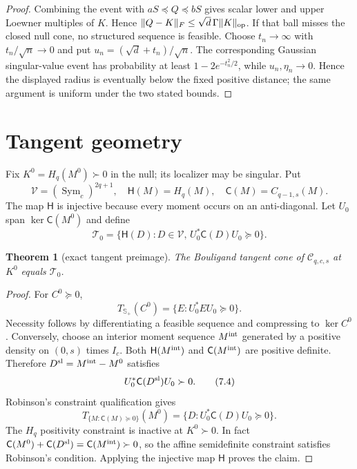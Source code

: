 \documentclass[11pt]{article}
\newtheorem{theorem}{Theorem}[section]
\newcommand{\Sym}{\operatorname{Sym}}
\newcommand{\cC}{\mathcal C}
\newcommand{\cT}{\mathcal T}
\newcommand{\norm}[1]{\lVert #1\rVert}
\begin{document}
\begin{proof}
Combining the event with $aS\preceq Q\preceq bS$ gives scalar lower and
upper Loewner multiples of $K$.  Hence
$\norm{Q-K}_F\le\sqrt d\,\Gamma\norm{K}_{\rm op}$.  If that ball misses the
closed null cone, no structured sequence is feasible.  Choose $t_n\to\infty$
with $t_n/\sqrt n\to0$ and put $u_n=(\sqrt d+t_n)/\sqrt n$.  The corresponding
Gaussian singular-value event has probability at least $1-2e^{-t_n^2/2}$,
while $u_n,\eta_n\to0$.  Hence the displayed radius is eventually below the
fixed positive distance; the same argument is uniform under the two stated
bounds.
\end{proof}

\section{Tangent geometry}

Fix $K^0=H_q(M^0)\succ0$ in the null; its localizer may be singular.  Put
\[
\mathcal V=(\Sym_c)^{2q+1},\quad
\mathsf H(M)=H_q(M),\quad
\mathsf C(M)=C_{q-1,s}(M).                                       \tag{7.1}
\]
The map $\mathsf H$ is injective because every moment occurs on an
anti-diagonal.  Let $U_0$ span $\ker\mathsf C(M^0)$ and define
\[
\cT_0=\{\mathsf H(D):D\in\mathcal V,\,
U_0^*\mathsf C(D)U_0\succeq0\}.                                  \tag{7.2}\label{eq:tangent}
\]

\begin{theorem}[exact tangent preimage]\label{thm:tangent}
The Bouligand tangent cone of $\cC_{q,c,s}$ at $K^0$ equals $\cT_0$.
\end{theorem}

\begin{proof}
For $C^0\succeq0$,
\[
T_{\mathbb S_+}(C^0)=\{E:U_0^*EU_0\succeq0\}.                    \tag{7.3}
\]
Necessity follows by differentiating a feasible sequence and compressing to
$\ker C^0$.  Conversely, choose an interior moment sequence
$M^{\rm int}$ generated by a positive density on $(0,s)$ times $I_c$.
Both $\mathsf H(M^{\rm int})$ and $\mathsf C(M^{\rm int})$ are positive
definite.  Therefore $D^{\rm sl}=M^{\rm int}-M^0$ satisfies
\[
U_0^*\mathsf C(D^{\rm sl})U_0\succ0.                              \tag{7.4}
\]
Robinson's constraint qualification gives
\[
T_{\{M:\mathsf C(M)\succeq0\}}(M^0)
=\{D:U_0^*\mathsf C(D)U_0\succeq0\}.                              \tag{7.5}
\]
The $H_q$ positivity constraint is inactive at $K^0\succ0$.  In fact
$\mathsf C(M^0)+\mathsf C(D^{\rm sl})=\mathsf C(M^{\rm int})\succ0$, so the
affine semidefinite constraint satisfies Robinson's condition.
Applying the injective map $\mathsf H$ proves the claim.
\end{proof}
\end{document}

